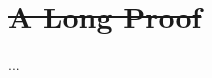 \documentclass[12pt,american]{report}
\providecommand{\DIFdeltex}[1]{{\protect\color{red}\sout{#1}}}                      %
\providecommand{\DIFdelbegin}{} %
\providecommand{\DIFdelend}{} %
\providecommand{\DIFdel}[1]{\texorpdfstring{\DIFdeltex{#1}}{}} %
\newcommand{\DIFscaledelfig}{0.5}
\newlength{\DIFdelgraphicswidth} %
\newlength{\DIFdelgraphicsheight} %
\newcommand{\DIFdelincludegraphics}[2][]{%
\sbox{\DIFdelgraphicsbox}{\DIFOincludegraphics[#1]{#2}}%
\settoboxwidth{\DIFdelgraphicswidth}{\DIFdelgraphicsbox} %
\settoboxtotalheight{\DIFdelgraphicsheight}{\DIFdelgraphicsbox} %
\scalebox{\DIFscaledelfig}{%
\parbox[b]{\DIFdelgraphicswidth}{\usebox{\DIFdelgraphicsbox}\\[-\baselineskip] \rule{\DIFdelgraphicswidth}{0em}}\llap{\resizebox{\DIFdelgraphicswidth}{\DIFdelgraphicsheight}{%
\setlength{\unitlength}{\DIFdelgraphicswidth}%
\begin{picture}(1,1)%
\thicklines\linethickness{2pt} %
{\color[rgb]{1,0,0}\put(0,0){\framebox(1,1){}}}%
{\color[rgb]{1,0,0}\put(0,0){\line( 1,1){1}}}%
{\color[rgb]{1,0,0}\put(0,1){\line(1,-1){1}}}%
\end{picture}%
}\hspace*{3pt}}} %
} %
\DeclareRobustCommand{\DIFdelbegin}{\DIFOdelbegin \let\includegraphics\DIFdelincludegraphics} %
\DeclareRobustCommand{\DIFdelend}{\DIFOaddend \let\includegraphics\DIFOincludegraphics} %
\begin{document}
\appendix
\DIFdelbegin \chapter{\DIFdel{A Long Proof}}
\addtocounter{chapter}{-1}%
\DIFdelend %
  ...
\end{document}
